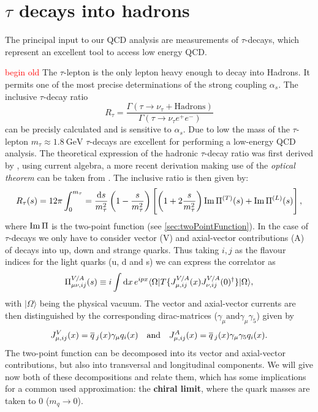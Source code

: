 \documentclass[../../index.tex]{subfiles}
\begin{document}
\chapter{$\tau$ decays into hadrons}
The principal input to our QCD analysis are measurements of $\tau$-decays, which
represent an excellent tool to access low energy QCD.

\textcolor{red}{begin old}
The $\tau$-lepton is the only lepton heavy enough to decay into Hadrons. It
permits one of the most precise determinations of the strong coupling $\alpha_s$.
The inclusive $\tau$-decay ratio
\begin{equation}
  \label{eq:inclusiveRatio}
  R_\tau = \frac{\Gamma(\tau \to \nu_\tau + \text{Hadrons})}{\Gamma(\tau \to \nu_\tau e^+ e^-)}
\end{equation}
can be precisly calculated and is sensitive to $\alpha_s$. Due to low the mass of
the $\tau$-lepton $m_\tau\approx\SI{1.8}{\giga\eV}$ $\tau$-decays are excellent
for performing a low-energy QCD analysis.
The theoretical expression of the hadronic $\tau$-decay ratio was first derived
by \cite{Tsai1971}, using current algebra, a more recent derivation making use
of the \textit{optical theorem} can be taken from \cite{Schwab2002}. The
inclusive ratio is then given by:
\begin{equation}
  \label{eq:hadronicTauDecayRatio}
  R_\tau(s) = 12 \pi \int_0^{m_\tau} = \frac{\dif s}{m_\tau^2}
  \left( 1 - \frac{s}{m_\tau^2} \right)
  \left[ \left( 1 + 2 \frac{s}{m_\tau^2} \right) \Ima \Pi^{(T)}(s) + \Ima \Pi^{(L)}(s) \right],
\end{equation}
where $\operatorname{Im} \Pi$ is the two-point function (see \cref{sec:twoPointFunction}). In
the case of $\tau$-decays we only have to consider vector (V) and axial-vector
contributions (A) of decays into up, down and strange quarks. Thus taking $i,j$ as the flavour
indices for the light quarks (u, d and s) we can express the correlator as
\begin{equation}
  \Pi_{\mu\nu,ij}^{V/A}(s) \equiv i \int \dif x \,e^{ipx} \langle \Omega | T \{ J_{\mu,ij}^{V/A}(x) J_{\nu,ij}^{V/A}(0)^\dagger \} | \Omega \rangle,
\end{equation}
with $|\Omega\rangle$ being the physical vacuum. The vector and axial-vector
currents are then distinguished by the corresponding dirac-matrices
($\gamma_\mu \text{and} \gamma_\mu \gamma_5$) given by
\begin{equation}
  J_{\mu,ij}^{V}(x) = \overline{q}\,_j(x) \gamma_\mu q_i(x) \quad \text{and} \quad J_{\mu,ij}^{A}(x) = \overline{q}\,_j(x) \gamma_\mu \gamma_5 q_i(x).
\end{equation}
The two-point function can be decomposed into its vector and axial-vector
contributions, but also into transversal and longitudinal components. We will
give now both of these decompositions and relate them, which has some
implications for a common used approximation: the \textbf{chiral limit}, where
the quark masses are taken to 0 ($m_q \to 0$).
\end{document}
